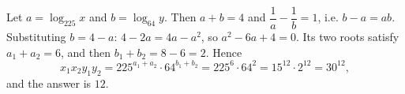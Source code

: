 Let $a=\log_{225}x$ and $b=\log_{64}y$. Then $a+b=4$ and $\dfrac{1}{a}-\dfrac{1}{b}=1$, i.e. $b-a=ab$. Substituting $b=4-a$: $4-2a=4a-a^2$, so $a^2-6a+4=0$. Its two roots satisfy $a_1+a_2=6$, and then $b_1+b_2=8-6=2$. Hence
\[x_1x_2y_1y_2=225^{a_1+a_2}\cdot64^{b_1+b_2}=225^6\cdot64^2=15^{12}\cdot2^{12}=30^{12},\]
and the answer is $\boxed{12}$.
